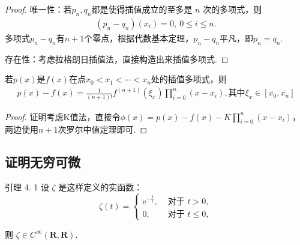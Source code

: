 \begin{proof}
    唯一性：若$p_n,q_n$都是使得插值成立的至多是 $n$ 次的多项式，则
    \begin{align*}
        (p_n-q_n)(x_i)=0,\ 0\leq i\leq n.
    \end{align*}
    多项式$p_n-q_n$有$n+1$个零点，根据代数基本定理，$p_n-q_n$平凡，即$p_n=q_n$.

    存在性：考虑拉格朗日插值法，直接构造出来插值多项式.
\end{proof}

\begin{theorem}[插值多项式误差定理]\label{插值多项式误差定理}
    若$p(x)$是$f(x)$在点$x_0< x_1< \cdots< x_n$处的插值多项式，则
    \begin{align*}
        p(x)-f(x)=\frac{1}{(n+1)!}f^{(n+1)}(\xi_x)\prod_{i=0}^{n}(x-x_i),\text{其中}\xi_x\in [x_0,x_n]
    \end{align*}
\end{theorem}

\begin{proof}
    证明考虑K值法，直接令$\displaystyle \phi(x)=p(x)-f(x)-K\prod_{i=0}^{n}(x-x_i)$，两边使用$n+1$次罗尔中值定理即可.
\end{proof}

\subsection{证明无穷可微}

\begin{example}
    引理 4. 1 设 $\zeta$ 是这样定义的实函数：
    $$
        \zeta(t)= \begin{cases}\mathrm{e}^{-\frac{1}{t}}, & \text { 对于 } t>0, \\ 0, & \text { 对于 } t \leqslant 0,\end{cases}
    $$

    则 $\zeta \in C^{\infty}(\boldsymbol{R}, \boldsymbol{R})$.
\end{example}

